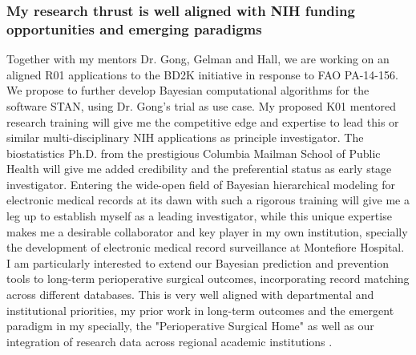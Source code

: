 \documentclass[11pt,notitlepage]{article}
\begin{document}
\subsubsection*{My research thrust is well aligned with NIH funding opportunities and emerging paradigms}
Together with my mentors Dr. Gong, Gelman and Hall, we are working on an aligned R01 applications to the BD2K initiative in response to FAO PA-14-156. We propose to further develop Bayesian computational algorithms for the software STAN, using Dr. Gong's trial as use case. My proposed K01 mentored research training will give me the competitive edge and expertise to lead this or similar multi-disciplinary NIH applications as principle investigator. The biostatistics Ph.D. from the prestigious Columbia Mailman School of Public Health will give me added credibility and the preferential status as early stage investigator. Entering the wide-open field of Bayesian hierarchical modeling for electronic medical records at its dawn with such a rigorous training will give me a leg up to establish myself as a leading investigator, while this unique expertise makes me a desirable collaborator and key player in my own institution, specially the development of electronic medical record surveillance at Montefiore Hospital. I am particularly interested to extend our Bayesian prediction and prevention tools to long-term perioperative surgical outcomes, incorporating record matching across different databases. This is very well aligned with departmental and institutional priorities, my prior work in long-term outcomes \cite{Andreae_23811426} and the emergent paradigm in my specially, the "Perioperative Surgical Home" \cite{Vetter_24781579} as well as our integration of research data across regional academic institutions \cite{Kaushal_24821739}.



\newpage


\end{document}
